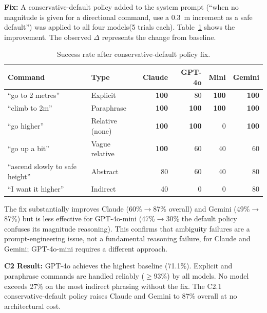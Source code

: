 \textbf{Fix:} A conservative-default policy added to the system prompt (``when no magnitude is given for a directional command, use a 0.3~m increment as a safe default'') was applied to all four models(5 trials each).
Table~\ref{tab:ch3_c2_1} shows the improvement.
The observed $\Delta$ represents the change from baseline.

\begin{table}[ht]
  \caption{Success rate after conservative-default policy fix.}
  \label{tab:ch3_c2_1}
  \centering
  \small
  \begin{tabular}{llrrrr}
    \toprule
    Command & Type & Claude & GPT-4o & Mini & Gemini \\
    \midrule
    ``go to 2 metres''              & Explicit         & \textbf{100} & 80  & \textbf{100} & \textbf{100} \\
    ``climb to 2m''                 & Paraphrase       & \textbf{100} & \textbf{100}& \textbf{100} & \textbf{100} \\
    ``go higher''                   & Relative (none)  & \textbf{100} & \textbf{100}& 0            & \textbf{100} \\
    ``go up a bit''                 & Vague relative   & \textbf{100} & 60  & 40           & 60  \\
    ``ascend slowly to safe height''& Abstract         & 80           & 60  & 40           & 80  \\
    ``I want it higher''            & Indirect         & 40           & 0   & 0            & 80  \\
    \bottomrule
  \end{tabular}
\end{table}

The fix substantially improves Claude (60\%$\to$87\% overall) and Gemini (49\%$\to$87\%) but is less effective for GPT-4o-mini (47\%$\to$30\% the default policy confuses its magnitude reasoning). 
This confirms that ambiguity failures are a prompt-engineering issue, not a fundamental reasoning failure, for Claude and Gemini; GPT-4o-mini requires a different
approach.

\textbf{C2 Result:} GPT-4o achieves the highest baseline (71.1\%).
Explicit and paraphrase commands are handled reliably ($\geq$93\%) by all models. 
No model exceeds 27\% on the most indirect phrasing without the fix.
The C2.1 conservative-default policy raises Claude and Gemini to 87\% overall at no architectural cost.

